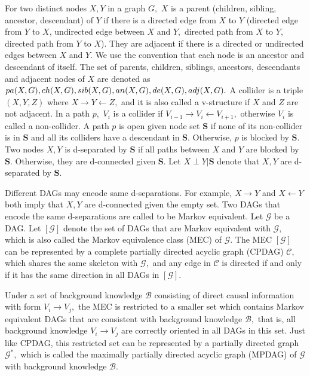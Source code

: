 \documentclass{article}
\begin{document}
For two distinct nodes $X,Y$ in a graph $G,$ $X$ is a parent (children, sibling, ancestor, descendant) of $Y$ if there is a directed edge from $X$ to $Y$ (directed edge from $Y$ to $X$, undirected edge between $X$ and $Y,$ directed path from $X$ to $Y$, directed path from $Y$ to $X$). They are adjacent if there is a directed or undirected edges between $X$ and $Y$. We use the convention that each node is an ancestor and descendant of itself. The set of parents, children, siblings, ancestors, descendants and adjacent nodes of $X$ are denoted as $pa(X,G),ch(X,G),sib(X,G), \\an(X,G),de(X,G),adj(X,G).$ A collider is a triple $(X,Y,Z)$ where $X\to Y\leftarrow Z,$ and it is also called a v-structure if $X$ and $Z$ are not adjacent. In a path $p,$ $V_i$ is a collider if $V_{i-1}\to V_i\leftarrow V_{i+1},$ otherwise $V_i$ is called a non-collider. A path $p$ is open given node set $\mathbf{S}$ if none of its non-collider is in $\mathbf{S}$ and all its colliders have a descendant in $\mathbf{S}.$ Otherwise, $p$ is blocked by $\mathbf{S}.$ Two nodes $X,Y$ is d-separated by $\mathbf{S}$ if all paths between $X$ and $Y$ are blocked by $\mathbf{S}.$ Otherwise, they are d-connected given $\mathbf{S}.$ Let $X\perp Y |\mathbf{S}$ denote that $X,Y$ are d-separated by $\mathbf{S}.$

Different DAGs may encode same d-separations. For example, $X\to Y$ and $X\leftarrow Y$ both imply that $X,Y$ are d-connected given the empty set. Two DAGs that encode the same d-separations are called to be Markov equivalent. Let $\mathcal{G}$ be a DAG. Let $[\mathcal{G}]$ denote the set of DAGs that are Markov equivalent with $\mathcal{G},$ which is also called the Markov equivalence class (MEC) of $\mathcal{G}.$ The MEC $[\mathcal{G}]$ can be represented by a complete partially directed acyclic graph (CPDAG) $\mathcal{C},$ which shares the same skeleton with $\mathcal{G},$ and any edge in $\mathcal{C}$ is directed if and only if it has the same direction in all DAGs in $[\mathcal{G}].$ 

Under a set of background knowledge $\mathcal{B}$ consisting of direct causal information with form $V_i\to V_j,$ the MEC is restricted to a smaller set which contains Markov equivalent DAGs that are consistent with background knowledge $\mathcal{B},$ that is, all background knowledge $V_i\to V_j$ are correctly oriented in all DAGs in this set. Just like CPDAG, this restricted set can be represented by a partially directed graph $\mathcal{G}^*,$ which is called the maximally partially directed acyclic graph (MPDAG) of $\mathcal{G}$ with background knowledge $\mathcal{B}.$ 
\end{document}
